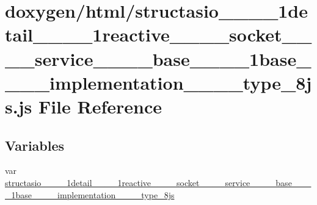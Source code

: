 \hypertarget{structasio____1____1detail____1____1reactive________socket________service________base____1____1b2aa0a8d8e16135d6ce2f622215e78784}{}\section{doxygen/html/structasio\+\_\+\+\_\+\_\+\+\_\+1detail\+\_\+\+\_\+\_\+\+\_\+1reactive\+\_\+\+\_\+\+\_\+\+\_\+socket\+\_\+\+\_\+\+\_\+\+\_\+service\+\_\+\+\_\+\+\_\+\+\_\+base\+\_\+\+\_\+\_\+\+\_\+1base\+\_\+\+\_\+\+\_\+\+\_\+implementation\+\_\+\+\_\+\+\_\+\+\_\+type\+\_\+8js.js File Reference}
\label{structasio____1____1detail____1____1reactive________socket________service________base____1____1b2aa0a8d8e16135d6ce2f622215e78784}
\subsection*{Variables}
\begin{DoxyCompactItemize}
\item 
var \hyperlink{structasio____1____1detail____1____1reactive________socket________service________base____1____1b2aa0a8d8e16135d6ce2f622215e78784_a1ae5e50d34c6317848d83c986ffc7582}{structasio\+\_\+\+\_\+\_\+\+\_\+1detail\+\_\+\+\_\+\_\+\+\_\+1reactive\+\_\+\+\_\+\+\_\+\+\_\+socket\+\_\+\+\_\+\+\_\+\+\_\+service\+\_\+\+\_\+\+\_\+\+\_\+base\+\_\+\+\_\+\_\+\+\_\+1base\+\_\+\+\_\+\+\_\+\+\_\+implementation\+\_\+\+\_\+\+\_\+\+\_\+type\+\_\+8js}
\end{DoxyCompactItemize}



